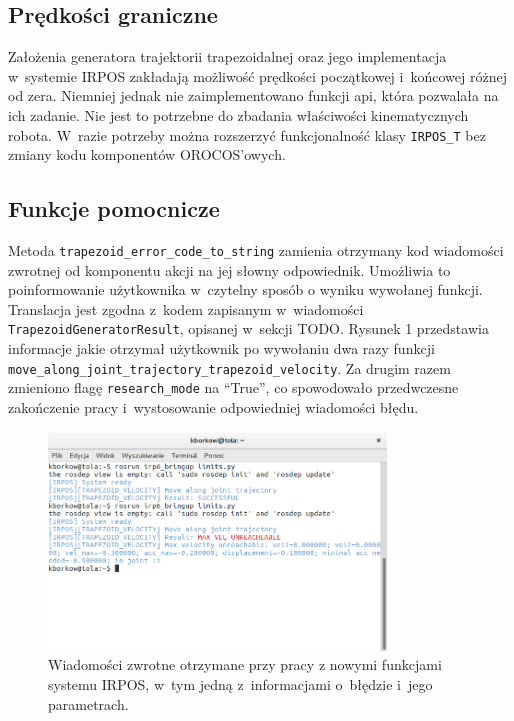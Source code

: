 \documentclass[a4paper, 12pt]{article}
\begin{document}
	\subsection{Prędkości graniczne}
	\label{sec:borderVels}
	Założenia generatora trajektorii trapezoidalnej oraz jego implementacja w~systemie IRPOS zakładają możliwość prędkości początkowej i~końcowej różnej od zera. Niemniej jednak nie zaimplementowano funkcji api, która pozwalała na ich zadanie. Nie jest to potrzebne do zbadania właściwości kinematycznych robota. W~razie potrzeby można rozszerzyć funkcjonalność klasy \texttt{IRPOS\_T} bez zmiany kodu komponentów OROCOS'owych.
	
	\subsection{Funkcje pomocnicze}
	\label{sec:auxilary}
	Metoda \texttt{trapezoid\_error\_code\_to\_string} zamienia otrzymany kod wiadomości zwrotnej od komponentu akcji na jej słowny odpowiednik. Umożliwia to poinformowanie użytkownika w~czytelny sposób o wyniku wywołanej funkcji.
	Translacja jest zgodna z~kodem zapisanym w~wiadomości \texttt{TrapezoidGeneratorResult}, opisanej w~sekcji TODO. Rysunek 1 przedstawia informacje jakie otrzymał użytkownik po wywołaniu dwa razy funkcji 
	\linebreak
	\texttt{move\_along\_joint\_trajectory\_trapezoid\_velocity}. Za drugim razem zmieniono flagę \linebreak \texttt{research\_mode} na \textquotedblleft True\textquotedblright, co spowodowało przedwczesne zakończenie pracy i~wystosowanie odpowiedniej wiadomości błędu.
	\begin{figure}[t]
	\centering
	\includegraphics[width=0.8\textwidth]{raport_pics/msgs_from_gen.png}
	\caption{Wiadomości zwrotne otrzymane przy pracy z nowymi funkcjami systemu IRPOS, w~tym jedną z~informacjami o~błędzie i~jego parametrach.}
	\label{}
	\end{figure}
	
\end{document}
